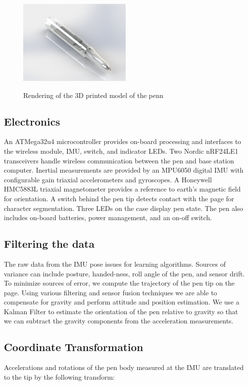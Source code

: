 \documentclass{article}
\begin{document}
\begin{figure}[H]
	\centering
	\includegraphics[width=0.5\textwidth, height= 5cm]{pen_render.png}
	\caption{Rendering of the 3D printed model of the penn}
\end{figure}

\subsection{Electronics}
An ATMega32u4 microcontroller provides on-board processing and interfaces to the wireless module, IMU, switch, and indicator LEDs. Two Nordic nRF24LE1 transceivers handle wireless communication between the pen and base station computer. Inertial measurements are provided by an MPU6050 digital IMU with configurable gain triaxial accelerometers and gyroscopes. A Honeywell HMC5883L triaxial magnetometer provides a reference to earth's magnetic field for orientation. A switch behind the pen tip detects contact with the page for character segmentation. Three LEDs on the case display pen state. The pen also includes on-board batteries, power management, and an on-off switch.

\subsection{Filtering the data}

The raw data from the IMU pose issues for learning algorithms. Sources of variance can include posture, handed-ness, roll angle of the pen, and sensor drift. To minimize sources of error, we compute the trajectory of the pen tip on the page. Using various filtering and sensor fusion techniques we are able to compensate for gravity and perform attitude and position estimation. We use a Kalman Filter to estimate the orientation of the pen relative to gravity so that we can subtract the gravity components from the acceleration measurements. 

\subsection{Coordinate Transformation}
Accelerations and rotations of the pen body measured at the IMU are translated to the tip by the following transform:
\end{document}
